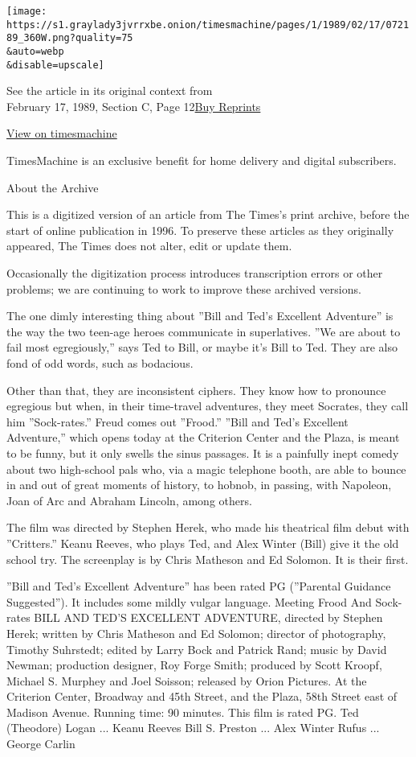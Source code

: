 \texttt{[image: https://s1.graylady3jvrrxbe.onion/timesmachine/pages/1/1989/02/17/072189\_360W.png?quality=75\\\&auto=webp\\\&disable=upscale]}

See the article in its original context from\\
February 17, 1989, Section C, Page
12\href{https://store.nytimes3xbfgragh.onion/collections/new-york-times-page-reprints?utm_source=nytimes\&utm_medium=article-page\&utm_campaign=reprints}{Buy
Reprints}

\href{http://timesmachine.nytimes3xbfgragh.onion/timesmachine/1989/02/17/072189.html}{View
on timesmachine}

TimesMachine is an exclusive benefit for home delivery and digital
subscribers.

About the Archive

This is a digitized version of an article from The Times's print
archive, before the start of online publication in 1996. To preserve
these articles as they originally appeared, The Times does not alter,
edit or update them.

Occasionally the digitization process introduces transcription errors or
other problems; we are continuing to work to improve these archived
versions.

The one dimly interesting thing about ''Bill and Ted's Excellent
Adventure'' is the way the two teen-age heroes communicate in
superlatives. ''We are about to fail most egregiously,'' says Ted to
Bill, or maybe it's Bill to Ted. They are also fond of odd words, such
as bodacious.

Other than that, they are inconsistent ciphers. They know how to
pronounce egregious but when, in their time-travel adventures, they meet
Socrates, they call him ''Sock-rates.'' Freud comes out ''Frood.''
''Bill and Ted's Excellent Adventure,'' which opens today at the
Criterion Center and the Plaza, is meant to be funny, but it only swells
the sinus passages. It is a painfully inept comedy about two high-school
pals who, via a magic telephone booth, are able to bounce in and out of
great moments of history, to hobnob, in passing, with Napoleon, Joan of
Arc and Abraham Lincoln, among others.

The film was directed by Stephen Herek, who made his theatrical film
debut with ''Critters.'' Keanu Reeves, who plays Ted, and Alex Winter
(Bill) give it the old school try. The screenplay is by Chris Matheson
and Ed Solomon. It is their first.

''Bill and Ted's Excellent Adventure'' has been rated PG (''Parental
Guidance Suggested''). It includes some mildly vulgar language. Meeting
Frood And Sock-rates BILL AND TED'S EXCELLENT ADVENTURE, directed by
Stephen Herek; written by Chris Matheson and Ed Solomon; director of
photography, Timothy Suhrstedt; edited by Larry Bock and Patrick Rand;
music by David Newman; production designer, Roy Forge Smith; produced by
Scott Kroopf, Michael S. Murphey and Joel Soisson; released by Orion
Pictures. At the Criterion Center, Broadway and 45th Street, and the
Plaza, 58th Street east of Madison Avenue. Running time: 90 minutes.
This film is rated PG. Ted (Theodore) Logan ... Keanu Reeves Bill S.
Preston ... Alex Winter Rufus ... George Carlin

